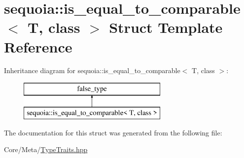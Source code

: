 \hypertarget{structsequoia_1_1is__equal__to__comparable}{}\section{sequoia\+::is\+\_\+equal\+\_\+to\+\_\+comparable$<$ T, class $>$ Struct Template Reference}
\label{structsequoia_1_1is__equal__to__comparable}
Inheritance diagram for sequoia\+::is\+\_\+equal\+\_\+to\+\_\+comparable$<$ T, class $>$\+:\begin{figure}[H]
\begin{center}
\leavevmode
\includegraphics[height=2.000000cm]{structsequoia_1_1is__equal__to__comparable}
\end{center}
\end{figure}


The documentation for this struct was generated from the following file\+:\begin{DoxyCompactItemize}
\item 
Core/\+Meta/\mbox{\hyperlink{_type_traits_8hpp}{Type\+Traits.\+hpp}}\end{DoxyCompactItemize}

